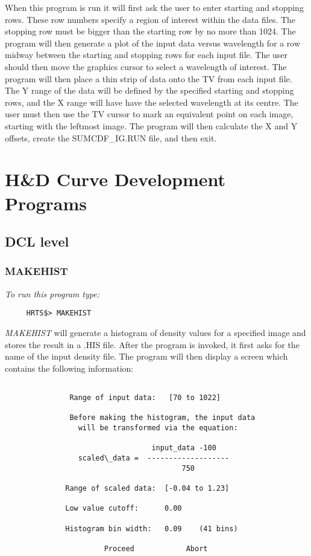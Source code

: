       When this program is run it will first ask the user to enter
   starting and stopping rows.  These row numbers specify a region of
   interest within the data files.  The stopping row must be bigger than
   the starting row by no more than 1024.  The program will then generate
   a plot of the input data versus wavelength for a row midway between the
   starting and stopping rows for each input file.  The user should then
   move the graphics cursor to select a wavelength of interest.  The
   program will then place a thin strip of data onto the TV from each
   input file.  The Y range of the data will be defined by the specified
   starting and stopping rows, and the X range will have have the selected
   wavelength at its centre.  The user must then use the TV cursor to mark
   an equivalent point on each image, starting with the leftmost image.
   The program will then calculate the X and Y offsets, create the
   SUMCDF\_IG.RUN file, and then exit.
\newpage

\section{H\&D Curve Development Programs}

\subsection{DCL level}

\subsubsection{MAKEHIST}

{\em To run this program type:}
\begin{verbatim}
     HRTS$> MAKEHIST
\end{verbatim}
{\em MAKEHIST} will generate a histogram of density values for a specified
   image and stores the result in a .HIS file.  After the program is
   invoked, it first asks for the name of the input density file.  The
   program will then display a screen which contains the following
   information:
\begin{center}
\begin{verbatim}

               Range of input data:   [70 to 1022]

               Before making the histogram, the input data
                 will be transformed via the equation:

                                  input_data -100
                 scaled\_data =  -------------------
                                         750

              Range of scaled data:  [-0.04 to 1.23]

              Low value cutoff:      0.00

              Histogram bin width:   0.09    (41 bins)

                       Proceed            Abort


\end{verbatim}
\end{center}

